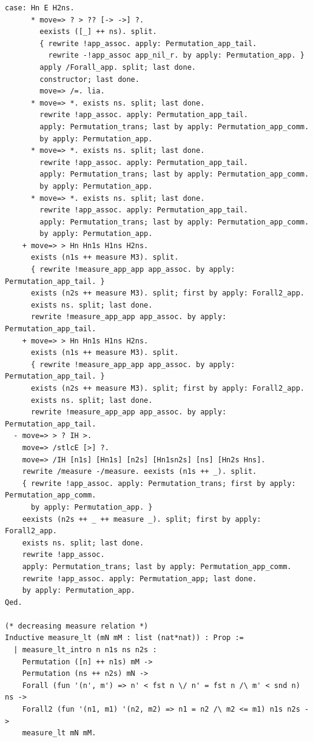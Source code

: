 \begin{lstlisting}[style=authorcoq]
      case: Hn E H2ns.
      * move=> ? > ?? [-> ->] ?.
        eexists ([_] ++ ns). split.
        { rewrite !app_assoc. apply: Permutation_app_tail.
          rewrite -!app_assoc app_nil_r. by apply: Permutation_app. }
        apply /Forall_app. split; last done.
        constructor; last done.
        move=> /=. lia.
      * move=> *. exists ns. split; last done.
        rewrite !app_assoc. apply: Permutation_app_tail.
        apply: Permutation_trans; last by apply: Permutation_app_comm.
        by apply: Permutation_app.
      * move=> *. exists ns. split; last done.
        rewrite !app_assoc. apply: Permutation_app_tail.
        apply: Permutation_trans; last by apply: Permutation_app_comm.
        by apply: Permutation_app.
      * move=> *. exists ns. split; last done.
        rewrite !app_assoc. apply: Permutation_app_tail.
        apply: Permutation_trans; last by apply: Permutation_app_comm.
        by apply: Permutation_app.
    + move=> > Hn Hn1s H1ns H2ns.
      exists (n1s ++ measure M3). split.
      { rewrite !measure_app_app app_assoc. by apply: Permutation_app_tail. }
      exists (n2s ++ measure M3). split; first by apply: Forall2_app.
      exists ns. split; last done.
      rewrite !measure_app_app app_assoc. by apply: Permutation_app_tail.
    + move=> > Hn Hn1s H1ns H2ns.
      exists (n1s ++ measure M3). split.
      { rewrite !measure_app_app app_assoc. by apply: Permutation_app_tail. }
      exists (n2s ++ measure M3). split; first by apply: Forall2_app.
      exists ns. split; last done.
      rewrite !measure_app_app app_assoc. by apply: Permutation_app_tail.
  - move=> > ? IH >.
    move=> /stlcE [>] ?.
    move=> /IH [n1s] [Hn1s] [n2s] [Hn1sn2s] [ns] [Hn2s Hns].
    rewrite /measure -/measure. eexists (n1s ++ _). split.
    { rewrite !app_assoc. apply: Permutation_trans; first by apply: Permutation_app_comm.
      by apply: Permutation_app. }
    eexists (n2s ++ _ ++ measure _). split; first by apply: Forall2_app.
    exists ns. split; last done.
    rewrite !app_assoc.
    apply: Permutation_trans; last by apply: Permutation_app_comm.
    rewrite !app_assoc. apply: Permutation_app; last done.
    by apply: Permutation_app.
Qed.

(* decreasing measure relation *)
Inductive measure_lt (mN mM : list (nat*nat)) : Prop :=
  | measure_lt_intro n n1s ns n2s :
    Permutation ([n] ++ n1s) mM ->
    Permutation (ns ++ n2s) mN ->
    Forall (fun '(n', m') => n' < fst n \/ n' = fst n /\ m' < snd n) ns ->
    Forall2 (fun '(n1, m1) '(n2, m2) => n1 = n2 /\ m2 <= m1) n1s n2s ->
    measure_lt mN mM.


\end{lstlisting}
